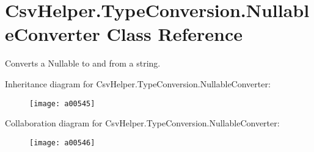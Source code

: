\hypertarget{a00136}{\section{Csv\-Helper.\-Type\-Conversion.\-Nullable\-Converter Class Reference}
\label{a00136}
}


Converts a Nullable to and from a string.  




Inheritance diagram for Csv\-Helper.\-Type\-Conversion.\-Nullable\-Converter\-:
\nopagebreak
\begin{figure}[H]
\begin{center}
\leavevmode
\texttt{[image: a00545]}
\end{center}
\end{figure}


Collaboration diagram for Csv\-Helper.\-Type\-Conversion.\-Nullable\-Converter\-:
\nopagebreak
\begin{figure}[H]
\begin{center}
\leavevmode
\texttt{[image: a00546]}
\end{center}
\end{figure}
